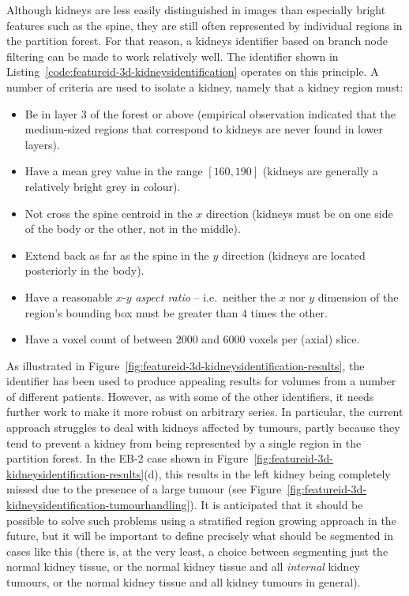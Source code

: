 \noindent Although kidneys are less easily distinguished in images than especially bright features such as the spine, they are still often represented by individual regions in the partition forest. For that reason, a kidneys identifier based on branch node filtering can be made to work relatively well. The identifier shown in Listing~\ref{code:featureid-3d-kidneysidentification} operates on this principle. A number of criteria are used to isolate a kidney, namely that a kidney region must:
%
\begin{itemize}
\item Be in layer $3$ of the forest or above (empirical observation indicated that the medium-sized regions that correspond to kidneys are never found in lower layers).
\item Have a mean grey value in the range $[160,190]$ (kidneys are generally a relatively bright grey in colour).
\item Not cross the spine centroid in the $x$ direction (kidneys must be on one side of the body or the other, not in the middle).
\item Extend back as far as the spine in the $y$ direction (kidneys are located posteriorly in the body).
\item Have a reasonable $x$-$y$ \emph{aspect ratio} -- i.e.~neither the $x$ nor $y$ dimension of the region's bounding box must be greater than $4$ times the other.
\item Have a voxel count of between $2000$ and $6000$ voxels per (axial) slice.
\end{itemize}
%
As illustrated in Figure~\ref{fig:featureid-3d-kidneysidentification-results}, the identifier has been used to produce appealing results for volumes from a number of different patients. However, as with some of the other identifiers, it needs further work to make it more robust on arbitrary series. In particular, the current approach struggles to deal with kidneys affected by tumours, partly because they tend to prevent a kidney from being represented by a single region in the partition forest. In the EB-2 case shown in Figure~\ref{fig:featureid-3d-kidneysidentification-results}(d), this results in the left kidney being completely missed due to the presence of a large tumour (see Figure~\ref{fig:featureid-3d-kidneysidentification-tumourhandling}). It is anticipated that it should be possible to solve such problems using a stratified region growing approach in the future, but it will be important to define precisely what should be segmented in cases like this (there is, at the very least, a choice between segmenting just the normal kidney tissue, or the normal kidney tissue and all \emph{internal} kidney tumours, or the normal kidney tissue and all kidney tumours in general).

